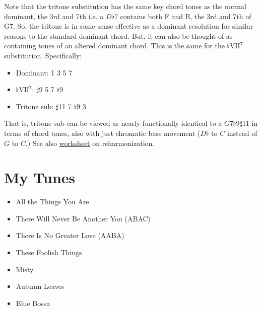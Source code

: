 \documentclass[10pt,a4paper]{article}
\begin{document}
Note that the tritone substitution has the same key chord tones as the normal dominant, the 3rd and 7th i.e. a $D\flat 7$ contains both F and B, the 3rd and 7th of G7. So, the tritone is in some sense effective as a dominant resolution for similar reasons to the standard dominant chord. But, it can also be thought of as containing tones of an altered dominant chord. This is the same for the $\flat\text{VII}^7$ substitution. Specifically:
\begin{itemize}
    \item Dominant: 1 3 5 7
    \item $\flat\text{VII}^7$: $\sharp$9 5 7 $\flat$9 
    \item Tritone sub: $\sharp$11 7 $\flat$9 3
\end{itemize}
That is, tritone sub can be viewed as nearly functionally identical to a $G7 \flat 9 \sharp 11$ in terms of chord tones, also with just chromatic bass movement ($D \flat$ to $C$ instead of $G$ to $C$.)
See also \href{https://www.dropbox.com/scl/fi/ay6ql2wswc1xbni9349y7/reharmonization_techniques.jpg?rlkey=lfklj71wrfsl6aam7p4pjmh6r&dl=0}{worksheet} on reharmonization.

\section{My Tunes}

\begin{itemize}
    \item All the Things You Are
    \item There Will Never Be Another You (ABAC)
    \item There Is No Greater Love (AABA)
    \item These Foolish Things
    \item Misty
    \item Autumn Leaves
    \item Blue Bossa
\end{itemize}
\end{document}
